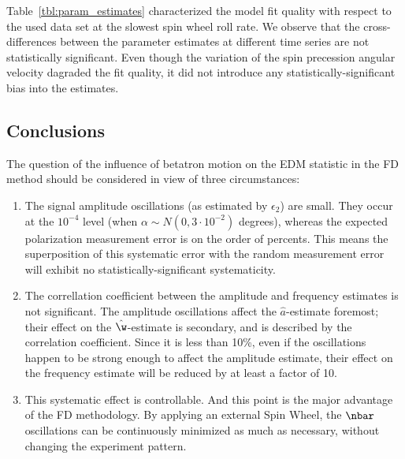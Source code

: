 Table~\ref{tbl:param_estimates} characterized the model fit quality with respect to the used data set at the
slowest spin wheel roll rate. We observe that the cross-differences between the parameter estimates at different
time series are not statistically significant. Even though the variation of the spin precession angular velocity
dagraded the fit quality, it did not introduce any statistically-significant bias into the estimates.


\subsection{Conclusions}
The question of the influence of betatron motion on the EDM statistic in the FD method should be considered
in view of three circumstances:
\begin{enumerate}
\item The signal amplitude oscillations (as estimated by $\epsilon_2$) are small.
  They occur at the $10^{-4}$ level (when $\alpha\sim N(0, 3\cdot 10^{-2})$ degrees), whereas
  the expected polarization measurement error is on the order of percents.
  This means the superposition of this systematic error with the random measurement error
  will exhibit no statistically-significant systematicity.
\item The correllation coefficient between the amplitude and frequency estimates is not significant. The amplitude
  oscillations affect the $\hat a$-estimate foremost; their effect on the $\hat\w$-estimate is secondary, and is
  described by the correlation coefficient. Since it is less than 10\%, even if the oscillations happen to be
  strong enough to affect the amplitude estimate, their effect on the frequency estimate will be reduced by
  at least a factor of 10.
\item This systematic effect is controllable. And this point is the major advantage of the FD methodology.
  By applying an external Spin Wheel, the $\nbar$ oscillations can be continuously minimized
  as much as necessary, without changing the experiment pattern.
\end{enumerate}
